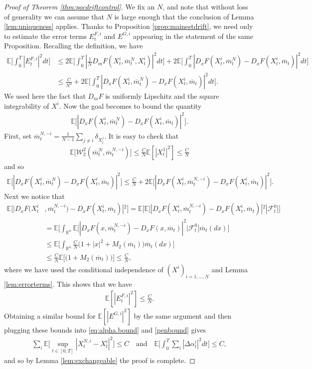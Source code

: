 \documentclass[11pt,reqno]{amsart}
\numberwithin{equation}{section}
\theoremstyle{definition}
\def\E{{\mathbb E}}
\def\R{{\mathbb R}}
\newcommand{\sF}{\mathcal{F}}
\newcommand{\ov}{\overline}
\newcommand\cW{\mathcal W}
\def \E{\mathbb{E}}
\def \R{\mathbb{R}}
\begin{document}
\begin{proof}[Proof of Theorem \ref{thm:pocdriftcontrol}]
We fix an $N$, and note that without loss of generality we can assume that $N$ is large enough that the conclusion of Lemma \ref{lem:uniqueness} applies.
  Thanks to Proposition \ref{prop:mainestdrift}, we need only to estimate the error terms $E_t^{F,i}$ and $E^{G,i}$ appearing in the statement of the same Proposition.  Recalling the definition, we have
\begin{align*}
  \E\bigg[\int_0^T |E_t^{F,i}|^2 dt\bigg] &\leq 2 \E\bigg[\int_0^T |\frac{1}{N} D_m F(X_t^{i}, \ov{m}_t^N, X_t^{i})|^2 dt \bigg] + 2 \E\bigg[\int_0^T |D_x F(X_t^i, \ov{m}_t^N) - D_x F(X_t^i, \ov{m}_t)|^2 dt \bigg] \\
  &\leq \frac{C}{N^2} + 2 \E\bigg[\int_0^T|D_x F(X_t^i, \ov{m}_t^N) - D_x F(X_t^i, \ov{m}_t)|^2dt\bigg].
\end{align*}
We used here the fact that $D_m F$ is uniformly Lipschitz and the square integrability of $X^i$.
Now the goal becomes to bound the quantity
\begin{align*}
\E\big[|D_x F(X_t^i, \ov{m}_t^N) - D_x F(X_t^i, \ov{m}_t)|^2\big]. 
\end{align*}
First, set $\ov{m}_t^{N,-i} = \frac{1}{N-1} \sum_{j \neq i} \delta_{X_t^j}$. It is easy to check that 
\begin{align*}
\E\big[\cW^2_2(\ov{m}_t^N, \ov{m}_t^{N,-i}) \big] \leq \frac{C}{N} \E[|X_t^1|^2] \leq \frac{C}{N} 
\end{align*}
and so 
\begin{align*}
\E\big[|D_x F(X_t^i, \ov{m}_t^N) - D_x F(X_t^i, \ov{m}_t)|^2\big] \leq \frac{C}{N} + 2\E\big[|D_x F(X_t^i, \ov{m}_t^{N,-i}) - D_x F(X_t^i, \ov{m}_t)|^2\big].  
\end{align*}
Next we notice that 
\begin{align*}
\E\big[|D_x F(X_t^i&, \ov{m}_t^{N,-i}) - D_x F(X_t^i, \ov{m}_t)|^2\big] = \E\Big[ \E\big[|D_x F(X_t^i, \ov{m}_t^{N,-i}) - D_x F(X_t^i, \ov{m}_t)|^2 | \sF_t^{0} \big] \Big] \\
&= \E\bigg[\int_{\R^n} \E\big[|D_x F(x, \ov{m}_t^{N,-i}) - D_x F(x, \ov{m}_t)|^2 | \sF_t^0 \big] \ov{m}_t(dx) \bigg] \\
& \leq \E\bigg[ \int_{\R^n} \frac{C}{N} \big(1 + |x|^2 + M_2(\ov{m}_t) \big) \ov{m}_t(dx) \bigg] \\
& \leq \frac{C}{N}\E\big[\big(1 + M_2(\ov{m}_t)\big) \big] \leq \frac{C}{N},
\end{align*}
where we have used the conditional independence of $(X^{i})_{i = 1,\dots,N}$ and Lemma \ref{lem:errorterms}. This shows that we have 
\begin{align*}
\E[|E_t^{F,i}|^2] \leq \frac{C}{N}.
\end{align*}
Obtaining a similar bound for $\E[|E^{G,i}|^2]$ by the same argument and then plugging these bounds into \eqref{eq:alpha.bound} and \eqref{penbound} gives 
\begin{align}
  \sum_i\E\Big[\sup_{t\in [0,T]}|X^{N,i}_t-X^i_t|^2\Big]\le C\quad \mathrm{and}\quad \E\bigg[\int_0^T \sum_i |\Delta \alpha_t^i|^2 dt \bigg] \leq C, 
\end{align}
and so by Lemma \ref{lem:exchangeable} the proof is complete.
\end{proof}
\end{document}
